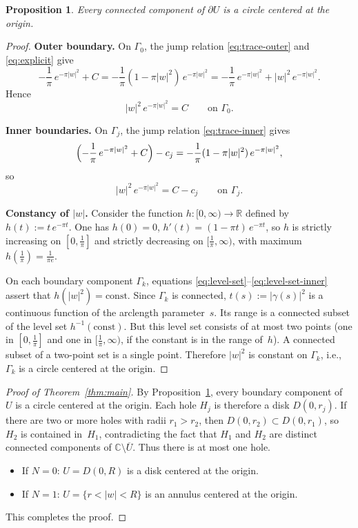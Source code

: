 \documentclass[11pt]{article}
\newtheorem{proposition}[theorem]{Proposition}
\newcommand{\C}{\mathbb C}
\newcommand{\R}{\mathbb R}
\newcommand{\1}{\mathbf 1}
\begin{document}
\begin{proposition}\label{prop:circles}
Every connected component of \(\partial U\) is a circle centered at the origin.
\end{proposition}

\begin{proof}
\textbf{Outer boundary.}
On \(\Gamma_0\), the jump relation \eqref{eq:trace-outer} and
\eqref{eq:explicit} give
\[
-\frac1\pi\,e^{-\pi|w|^2}+C
=
-\frac1\pi(1-\pi|w|^2)\,e^{-\pi|w|^2}
=
-\frac1\pi\,e^{-\pi|w|^2}+|w|^2\,e^{-\pi|w|^2}.
\]
Hence
\begin{equation}\label{eq:level-set}
|w|^2\,e^{-\pi|w|^2}=C
\qquad\text{on }\Gamma_0.
\end{equation}

\textbf{Inner boundaries.}
On \(\Gamma_j\), the jump relation \eqref{eq:trace-inner} gives
\[
\Bigl(-\frac1\pi\,e^{-\pi|w|^2}+C\Bigr)-c_j
=
-\frac1\pi(1-\pi|w|^2)\,e^{-\pi|w|^2},
\]
so
\begin{equation}\label{eq:level-set-inner}
|w|^2\,e^{-\pi|w|^2}=C-c_j
\qquad\text{on }\Gamma_j.
\end{equation}

\textbf{Constancy of \(|w|\).}
Consider the function \(h:[0,\infty)\to\R\) defined by
\(h(t):=t\,e^{-\pi t}\). One has \(h(0)=0\),
\(h'(t)=(1-\pi t)\,e^{-\pi t}\), so \(h\) is strictly increasing on
\([0,\frac1\pi]\) and strictly decreasing on \([\frac1\pi,\infty)\),
with maximum \(h(\frac1\pi)=\frac1{\pi e}\).

On each boundary component \(\Gamma_k\), equations
\eqref{eq:level-set}--\eqref{eq:level-set-inner} assert that
\(h(|w|^2)=\text{const}\). Since \(\Gamma_k\) is connected,
\(t(s):=|\gamma(s)|^2\) is a continuous function of the arclength
parameter~\(s\). Its range is a connected subset of the level set
\(h^{-1}(\text{const})\). But this level set consists of at most two
points (one in \([0,\frac1\pi]\) and one in \([\frac1\pi,\infty)\), if
the constant is in the range of~\(h\)). A connected subset of a
two-point set is a single point. Therefore \(|w|^2\) is constant on
\(\Gamma_k\), i.e., \(\Gamma_k\) is a circle centered at the origin.
\end{proof}

\begin{proof}[Proof of Theorem~\ref{thm:main}]
By Proposition~\ref{prop:circles}, every boundary component of~\(U\) is a circle centered
at the origin. Each hole \(H_j\) is therefore a disk \(D(0,r_j)\). If there are two or
more holes with radii \(r_1>r_2\), then \(D(0,r_2)\subset D(0,r_1)\), so \(H_2\) is
contained in~\(H_1\), contradicting the fact that \(H_1\) and \(H_2\) are distinct
connected components of \(\C\setminus\overline U\). Thus there is at most one hole.
\begin{itemize}
\item If \(N=0\): \(U=D(0,R)\) is a disk centered at the origin.
\item If \(N=1\): \(U=\{r<|w|<R\}\) is an annulus centered at the origin.
\end{itemize}
This completes the proof.
\end{proof}
\end{document}
